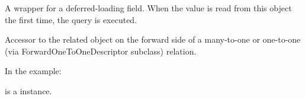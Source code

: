 \documentclass[letterpaper,10pt,english]{sphinxmanual}
\begin{document}
\begin{fulllineitems}
\begin{fulllineitems}
\end{fulllineitems}


\begin{fulllineitems}
\label{\detokenize{modules/models:gestion.models.HistoricalKegHistory.history_object}}
\end{fulllineitems}


\begin{fulllineitems}
\label{\detokenize{modules/models:gestion.models.HistoricalKegHistory.history_type}}
A wrapper for a deferred-loading field. When the value is read from this
object the first time, the query is executed.

\end{fulllineitems}


\begin{fulllineitems}
\label{\detokenize{modules/models:gestion.models.HistoricalKegHistory.history_user}}
Accessor to the related object on the forward side of a many-to-one or
one-to-one (via ForwardOneToOneDescriptor subclass) relation.

In the example:

\begin{sphinxVerbatim}[commandchars=\\\{\}]
 
       
\end{sphinxVerbatim}

 is a  instance.

\end{fulllineitems}


\end{fulllineitems}
\end{document}
